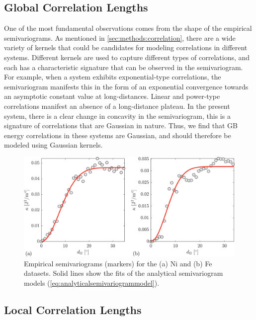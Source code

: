\documentclass[preprint,12pt]{elsarticle}
\begin{document}
    \subsection{Global Correlation Lengths} \label{sec:supp:semivariogram:global}
	One of the most fundamental observations comes from the shape of the empirical semivariograms. As mentioned in \cref{sec:methods:correlation}, there are a wide variety of kernels that could be candidates for modeling correlations in different systems. Different kernels are used to capture different types of correlations, and each has a characteristic signature that can be observed in the semivariogram. For example, when a system exhibits exponential-type correlations, the semivariogram manifests this in the form of an exponential convergence towards an asymptotic constant value at long-distances. Linear and power-type correlations manifest an absence of a long-distance plateau. In the present system, there is a clear change in concavity in the semivariogram, this is a signature of correlations that are Gaussian in nature. Thus, we find that GB energy correlations in these systems are Gaussian, and should therefore be modeled using Gaussian kernels.
	\begin{figure}
	    \centering
	    \includegraphics[scale=0.75]{figures/GlobalCorrelationLengthVariograms.png}
	    \caption{Empirical semivariograms (markers) for the (a) Ni and (b) Fe datasets. Solid lines show the fits of the analytical semivariogram models (\cref{eq:analyticalsemivariogrammodel}).}
	    \label{fig:globalvariogramfits}
	\end{figure}
	
	\subsection{Local Correlation Lengths} \label{sec:supp:semivariogram:local}
\end{document}

